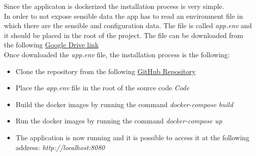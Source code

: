 Since the applicaton is dockerized the installation process is very simple. \\
In order to not expose sensible data the app has to read an environment file in which there are the sensible and configuration data. The file is called \textit{app.env} and it should be placed in the root of the project. The file can be downloaded from the following \href{https://drive.google.com/file/d/1KUKvAb3Tq8bOUhCrtx5sqfwQsWZShJam/view?usp=sharing}{Google Drive link} \\
Once downloaded the \textit{app.env} file, the installation process is the following:
\begin{itemize}
        \item Clone the repository from the following \href{https://github.com/piconepaolo/PiconeRusso/tree/main/ITD/Code}{GitHub Repository}
        \item Place the \textit{app.env} file in the root of the source code \textit{Code}
        \item Build the docker images by running the command \textit{docker-compose build}
        \item Run the docker images by running the command \textit{docker-compose up}
        \item The application is now running and it is possible to access it at the following address: \textit{http://localhost:8080}
\end{itemize}
